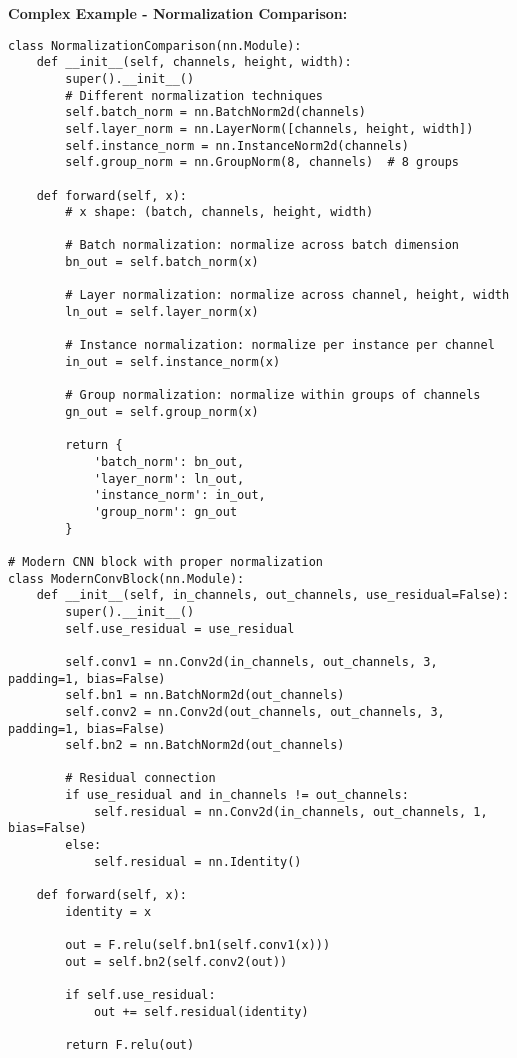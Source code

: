 \documentclass[11pt,a4paper]{book}
\begin{document}
\textbf{Complex Example - Normalization Comparison:}
\begin{verbatim}
class NormalizationComparison(nn.Module):
    def __init__(self, channels, height, width):
        super().__init__()
        # Different normalization techniques
        self.batch_norm = nn.BatchNorm2d(channels)
        self.layer_norm = nn.LayerNorm([channels, height, width])
        self.instance_norm = nn.InstanceNorm2d(channels)
        self.group_norm = nn.GroupNorm(8, channels)  # 8 groups
        
    def forward(self, x):
        # x shape: (batch, channels, height, width)
        
        # Batch normalization: normalize across batch dimension
        bn_out = self.batch_norm(x)
        
        # Layer normalization: normalize across channel, height, width
        ln_out = self.layer_norm(x)
        
        # Instance normalization: normalize per instance per channel
        in_out = self.instance_norm(x)
        
        # Group normalization: normalize within groups of channels
        gn_out = self.group_norm(x)
        
        return {
            'batch_norm': bn_out,
            'layer_norm': ln_out,
            'instance_norm': in_out,
            'group_norm': gn_out
        }

# Modern CNN block with proper normalization
class ModernConvBlock(nn.Module):
    def __init__(self, in_channels, out_channels, use_residual=False):
        super().__init__()
        self.use_residual = use_residual
        
        self.conv1 = nn.Conv2d(in_channels, out_channels, 3, padding=1, bias=False)
        self.bn1 = nn.BatchNorm2d(out_channels)
        self.conv2 = nn.Conv2d(out_channels, out_channels, 3, padding=1, bias=False)
        self.bn2 = nn.BatchNorm2d(out_channels)
        
        # Residual connection
        if use_residual and in_channels != out_channels:
            self.residual = nn.Conv2d(in_channels, out_channels, 1, bias=False)
        else:
            self.residual = nn.Identity()
    
    def forward(self, x):
        identity = x
        
        out = F.relu(self.bn1(self.conv1(x)))
        out = self.bn2(self.conv2(out))
        
        if self.use_residual:
            out += self.residual(identity)
        
        return F.relu(out)
\end{verbatim}
\end{document}
